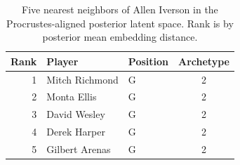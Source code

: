 \begin{table}[htbp]
  \centering\small
  \begin{tabular}{rllc}
    \toprule
    Rank & Player & Position & Archetype \\
    \midrule
    1 & Mitch Richmond & G & 2 \\
    2 & Monta Ellis & G & 2 \\
    3 & David Wesley & G & 2 \\
    4 & Derek Harper & G & 2 \\
    5 & Gilbert Arenas & G & 2 \\
    \bottomrule
  \end{tabular}
  \caption{Five nearest neighbors of Allen Iverson in the Procrustes-aligned posterior latent space. Rank is by posterior mean embedding distance.}
  \label{tab:Allen_Iverson_neighbors}
\end{table}


